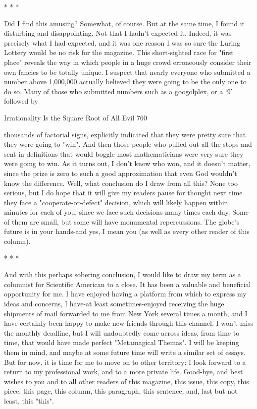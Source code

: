                                         *   *   *

        Did I find this amusing? Somewhat, of course. But at the same time, I found it
disturbing and disappointing. Not that I hadn't expected it. Indeed, it was precisely
what I had expected, and it was one reason I was so sure the Luring Lottery would be
no risk for the magazine.
        This short-sighted race for "first place" reveals the way in which people in a
huge crowd erroneously consider their own fancies to be totally unique. I suspect that
nearly everyone who submitted a number above 1,000,000 actually believed they
were going to be the only one to do so. Many of those who submitted numbers such as
a googolplex, or a `9' followed by




Irrationality Is the Square Root of All Evil                                        760

thousands of factorial signs, explicitly indicated that they were pretty sure that they
were going to "win". And then those people who pulled out all the stops and sent in
definitions that would boggle most mathematicians were very sure they were going to
win. As it turns out, I don't know who won, and it doesn't matter, since the prize is
zero to such a good approximation that even God wouldn't know the difference.
Well, what conclusion do I draw from all this? None too serious, but I do hope that it
will give my readers pause for thought next time they face a "cooperate-or-defect"
decision, which will likely happen within minutes for each of you, since we face such
decisions many times each day. Some of them are small, but some will have
monumental repercussions. The globe's future is in your hands-and yes, I mean you
(as well as every other reader of this column).

                                        *   *   *

        And with this perhaps sobering conclusion, I would like to draw my term as a
columnist for Scientific American to a close. It has been a valuable and beneficial
opportunity for me. I have enjoyed having a platform from which to express my ideas
and concerns, I have-at least sometimes-enjoyed receiving the huge shipments of mail
forwarded to me from New York several times a month, and I have certainly been
happy to make new friends through this channel. I won't miss the monthly deadline,
but I will undoubtedly come across ideas, from time to time, that would have made
perfect "Metamagical Themas". I will be keeping them in mind, and maybe at some
future time will write a similar set of essays.
        But for now, it is time for me to move on to other territory: I look forward to a
return to my professional work, and to a more private life. Good-bye, and best wishes
to you and to all other readers of this magazine, this issue, this copy, this piece, this
page, this column, this paragraph, this sentence, and, last but not least, this "this".

